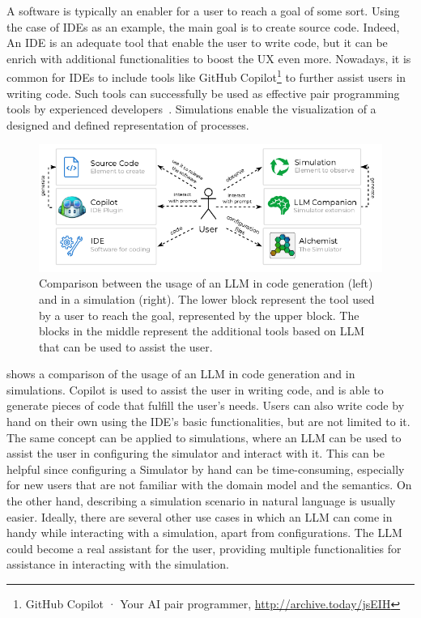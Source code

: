\documentclass[conference]{IEEEtran}
\begin{document}
A software is typically an enabler for a user to reach a goal of some sort.
%
Using the case of \acp{IDE} as an example,
the main goal is to create source code.
%
Indeed,
An IDE is an adequate tool that enable the user to write code,
but it can be enrich with additional functionalities to boost the \ac{UX} even more.
%
Nowadays,
it is common for \acp{IDE} to include tools like GitHub Copilot\footnote{
    GitHub Copilot · Your AI pair programmer, \url{http://archive.today/jsEIH}
} to further assist users in writing code.
%
Such tools can successfully be used as effective pair programming tools by experienced developers~\cite{DBLP:journals/jss/DakhelMNKDJ23}.
%
Simulations enable the visualization of a designed and defined representation of processes.
%
\begin{figure}
    \includegraphics[width=\columnwidth]{use-case}
    \caption{
        Comparison between the usage of an LLM in code generation (left) and in a simulation (right).
        The lower block represent the tool used by a user to reach the goal, represented by the upper block.
        The blocks in the middle represent the additional tools based on LLM that can be used to assist the user.
    }
    \label{fig:usecase}
\end{figure}
%
 shows a comparison of the usage of an \ac{LLM} in code generation and in simulations.
%
Copilot is used to assist the user in writing code,
and is able to generate pieces of code that fulfill the user's needs.
%
Users can also write code by hand on their own using the \ac{IDE}'s basic functionalities,
but are not limited to it.
%
The same concept can be applied to simulations,
where an \ac{LLM} can be used to assist the user in configuring the simulator and interact with it.
%
This can be helpful since configuring a Simulator by hand can be time-consuming,
especially for new users that are not familiar with the domain model and the semantics.
%
On the other hand,
describing a simulation scenario in natural language is usually easier.
%
Ideally,
there are several other use cases in which an \ac{LLM} can come in handy while interacting with a simulation,
apart from configurations.
%
The \ac{LLM} could become a real assistant for the user,
providing multiple functionalities for assistance in interacting with the simulation.
%
\end{document}
